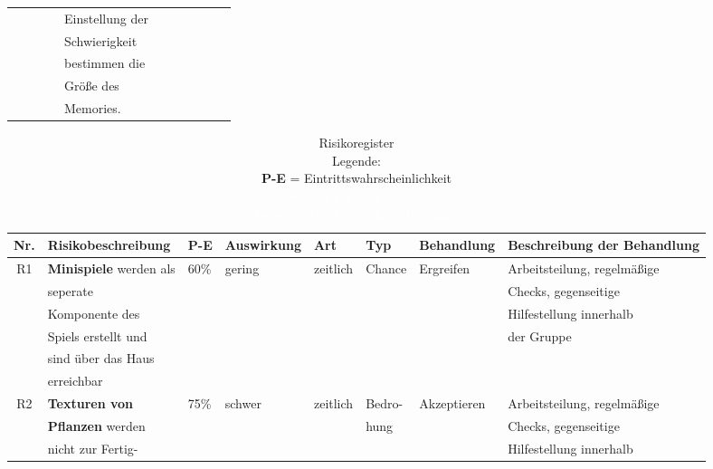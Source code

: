 \begin{longtable}{|c|l|l|c|l|l|c|c|l|l|l|}
            &       &            &    & Einstellung der &   &   & & & &\\
            &       &            &    & Schwierigkeit &   &   & & & &\\
            &       &            &    & bestimmen die &   &   & & & &\\
            &       &            &    & Größe des &   &   & & & &\\
            &       &            &    & Memories. &   &   & & & &\\
            \hline
            
    \end{longtable}  
    

\begin{table}[H]\label{tab:risk}
    \footnotesize
    \caption[Risikoregister]{Risikoregister \\ Legende: \\
            \textbf{P-E} = Eintrittswahrscheinlichkeit \\
            \tiny\textcolor{white}{Das ist wichtig für die Linksbündigkeit}\\
            \textcolor{white}{Das ist wichtig für die Linksbündigkeit}\\
            }
    \footnotesize
    \begin{tabular}{|c|l|l|l|l|l|l|l|}
        \hline
        Nr. & Risikobeschreibung & P-E & Auswirkung & Art & Typ & Behandlung & Beschreibung der Behandlung \\[0.5ex]
        \hline \hline
        R1 & \textbf{Minispiele} werden als & 60\% & gering & zeitlich & Chance & Ergreifen & Arbeitsteilung, regelmäßige\\
        & seperate &  &  &  &  && Checks, gegenseitige  \\
        & Komponente des &  &  & & &  & Hilfestellung innerhalb \\
        & Spiels erstellt und &  &&  &  &  & der Gruppe \\
        & sind über das Haus &  &  &  & & &  \\
        & erreichbar &  &  &  &  &&  \\
        \hline
        R2 & \textbf{Texturen von} & 75\% & schwer & zeitlich & Bedro- & Akzeptieren & Arbeitsteilung, regelmäßige \\
        & \textbf{Pflanzen} werden &  &&  & hung &  & Checks, gegenseitige  \\
        & nicht zur Fertig- &  &  &  & & & Hilfestellung innerhalb \\

\end{tabular}
\end{table}
